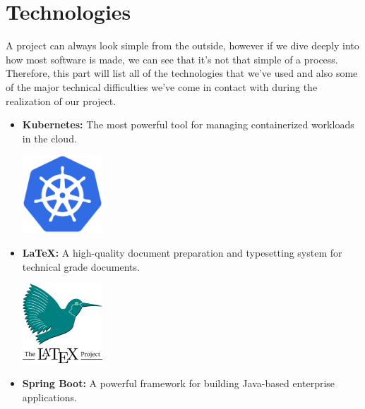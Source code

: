 \section{Technologies}
A project can always look simple from the outside, however if we dive deeply into how most software is made, we can see that it's not that simple of a process.
Therefore, this part will list all of the technologies that we've used and also some of the major technical difficulties we've come in contact with during the realization of our project.

\medskip

\begin{itemize}
    \item \textbf{Kubernetes:} \newline The most powerful tool for managing containerized workloads in the cloud. \newline
          \begin{minipage}{\linewidth}
              \centering
              \includegraphics[width=3cm]{src/assets/logos/kubernetes_512x512.png}
          \end{minipage}
    \item \textbf{LaTeX:} \newline \cite{latex-project} A high-quality document preparation and typesetting system for technical grade documents. \newline \newline
          \begin{minipage}{\linewidth}
              \centering
              \includegraphics[width=3cm]{src/assets/logos/latex_200x200.png}
          \end{minipage}
    \item \textbf{Spring Boot:} \newline A powerful framework for building Java-based enterprise applications. \newline \newline

\end{itemize}
